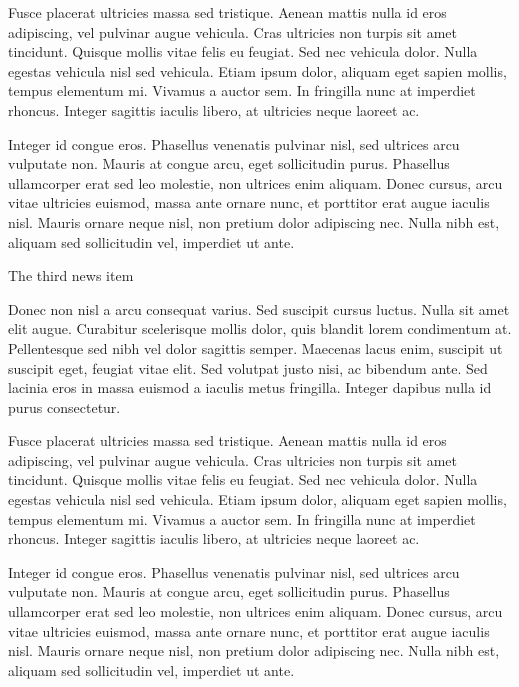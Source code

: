 \documentclass[10pt,a4paper]{article} %
\newcommand{\NewsItem}[1]{ %
\usefont{T1}{fvs}{n}{n} %
\vspace{24pt}\large #1\vspace{3pt} %
\par \normalsize \normalfont}
\begin{document}
\begin{multicols}{3} %

Fusce placerat ultricies massa sed tristique. Aenean mattis nulla id eros adipiscing, vel pulvinar augue vehicula. Cras ultricies non turpis sit amet tincidunt. Quisque mollis vitae felis eu feugiat. Sed nec vehicula dolor. Nulla egestas vehicula nisl sed vehicula. Etiam ipsum dolor, aliquam eget sapien mollis, tempus elementum mi. Vivamus a auctor sem. In fringilla nunc at imperdiet rhoncus. Integer sagittis iaculis libero, at ultricies neque laoreet ac.

Integer id congue eros. Phasellus venenatis pulvinar nisl, sed ultrices arcu vulputate non. Mauris at congue arcu, eget sollicitudin purus. Phasellus ullamcorper erat sed leo molestie, non ultrices enim aliquam. Donec cursus, arcu vitae ultricies euismod, massa ante ornare nunc, et porttitor erat augue iaculis nisl. Mauris ornare neque nisl, non pretium dolor adipiscing nec. Nulla nibh est, aliquam sed sollicitudin vel, imperdiet ut ante.


\NewsItem{The third news item}

Donec non nisl a arcu consequat varius. Sed suscipit cursus luctus. Nulla sit amet elit augue. Curabitur scelerisque mollis dolor, quis blandit lorem condimentum at. Pellentesque sed nibh vel dolor sagittis semper. Maecenas lacus enim, suscipit ut suscipit eget, feugiat vitae elit. Sed volutpat justo nisi, ac bibendum ante. Sed lacinia eros in massa euismod a iaculis metus fringilla. Integer dapibus nulla id purus consectetur.

Fusce placerat ultricies massa sed tristique. Aenean mattis nulla id eros adipiscing, vel pulvinar augue vehicula. Cras ultricies non turpis sit amet tincidunt. Quisque mollis vitae felis eu feugiat. Sed nec vehicula dolor. Nulla egestas vehicula nisl sed vehicula. Etiam ipsum dolor, aliquam eget sapien mollis, tempus elementum mi. Vivamus a auctor sem. In fringilla nunc at imperdiet rhoncus. Integer sagittis iaculis libero, at ultricies neque laoreet ac.

Integer id congue eros. Phasellus venenatis pulvinar nisl, sed ultrices arcu vulputate non. Mauris at congue arcu, eget sollicitudin purus. Phasellus ullamcorper erat sed leo molestie, non ultrices enim aliquam. Donec cursus, arcu vitae ultricies euismod, massa ante ornare nunc, et porttitor erat augue iaculis nisl. Mauris ornare neque nisl, non pretium dolor adipiscing nec. Nulla nibh est, aliquam sed sollicitudin vel, imperdiet ut ante.


\end{multicols}
\end{document}
